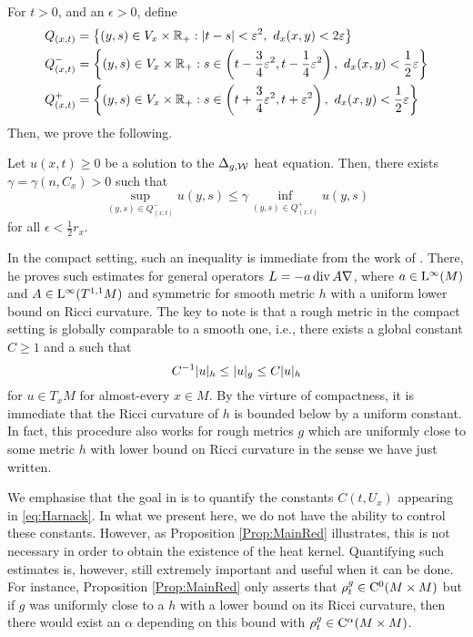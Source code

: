 \documentclass[a4paper, 12pt]{amsart}
\begin{document}
For $t > 0$, and an $\epsilon > 0$, define
\begin{equation}
\label{eq:paradef}
\begin{split} 
Q_{(x,t)} &= \set{(y,s) \in V_x \times \R_+: \modulus{t - s} < \epsilon^2,\ d_x(x,y) < 2 \epsilon} \\
Q^-_{(x,t)} &= \set{(y,s) \in V_x \times \R_+: s \in \cbrac{t - \frac{3}{4}\epsilon^2, t - \frac{1}{4} \epsilon^2},\ 
	d_x(x,y) < \frac{1}{2} \epsilon} \\
Q^+_{(x,t)} &= \set{(y,s) \in V_x \times \R_+: s \in \cbrac{t + \frac{3}{4}\epsilon^2, t + \epsilon^2},\ 
	d_x(x,y) < \frac{1}{2} \epsilon}
\end{split}
\end{equation}
Then, we prove the following. 

\begin{thm}
Let $u(x,t) \geq 0$ be a solution to the $\Delta_{g,\mathcal{W}}$ heat equation.
Then, there exists $\gamma = \gamma(n, C_x) > 0$ such that 
$$ \sup_{(y,s) \in Q^-_{(x,t)}} u(y, s) \leq \gamma \inf_{(y,s) \in Q^+_{(x,t)}} u(y,s)$$
for all $\epsilon < \frac{1}{2} r_x$.
\end{thm} 

In the compact setting, such an inequality 
is immediate from the work of \cite{SC}. There, 
he proves such estimates for general operators
$L = -a \operatorname{div} A \nabla$, where $a \in {\rm L}^{\infty}_{\rm {}}(M)$
and $A \in {\rm L}^{\infty}_{\rm {}}(T^{1,1}M)$ and symmetric
for smooth metric $h$ with a uniform lower bound
on Ricci curvature.
The key to note is that a rough metric in the 
compact setting is globally comparable to a smooth one, 
i.e., there exists a global constant $C \geq 1$ 
and a 
such that
$$ C^{-1} |u|_{h} \leq |u|_g \leq C |u|_{h}$$
for $u \in T_x M$ for almost-every $x \in M$.
By the virture of compactness, it is immediate
that the Ricci curvature of $h$ is bounded below
by a uniform constant. 
In fact, this procedure also works 
for rough metrics $g$ which 
are uniformly close to some metric $h$ with 
lower bound on Ricci curvature in the sense
we have just written.

We emphasise that the goal in \cite{SC}
is to quantify the constants $C(t,U_x)$
appearing in \eqref{eq:Harnack}. In what we present here, we do not have
the ability to control these constants. However, as
Proposition \ref{Prop:MainRed} illustrates, this is not necessary 
in order to obtain the existence of the heat kernel.
Quantifying such estimates is, however, still 
extremely important and useful when it can be done.
For instance, Proposition \ref{Prop:MainRed} 
only asserts that $\rho^{g}_t \in {\rm C}^{0}_{\rm {}}(M \times M)$
but if $g$ was uniformly close to a $h$
with a lower bound on its Ricci curvature, then
there would exist an $\alpha$ depending on this bound
with $\rho^{g}_t \in {\rm C}^{\alpha}_{\rm {}}(M \times M)$.
\note{Verfiy this is true}
\end{document}
